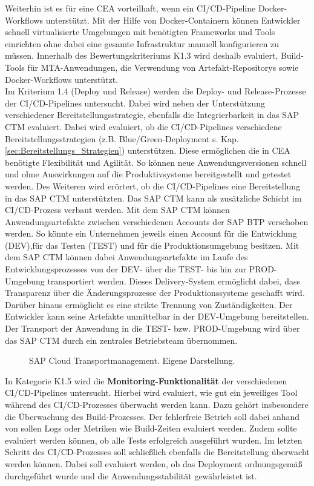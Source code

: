 \vspace*{-10mm}
Weiterhin ist es für eine CEA vorteilhaft, wenn ein CI/CD-Pipeline Docker-Workflows unterstützt. Mit der Hilfe von Docker-Containern können Entwickler schnell virtualisierte Umgebungen mit benötigten Frameworks und Tools einrichten ohne dabei eine gesamte Infrastruktur manuell konfigurieren zu müssen. Innerhalb des Bewertungskriteriums K1.3 wird deshalb evaluiert, Build-Tools für MTA-Anwendungen, die Verwendung von Artefakt-Repositorys sowie Docker-Workflows unterstützt.\\
Im Kriterium 1.4 (Deploy und Release) werden die Deploy- und Release-Prozesse der CI/CD-Pipelines untersucht. Dabei wird neben der Unterstützung verschiedener Bereitstellungsstrategie, ebenfalls die Integrierbarkeit in das \ac{SAP CTM} evaluiert. Dabei wird evaluiert, ob die CI/CD-Pipelines verschiedene Bereitstellungsstrategien (z.B. Blue/Green-Deployment s. Kap. \ref{sec:Bereitstellungs_Strategien}) unterstützen. Diese ermöglichen die in CEA benötigte Flexibilität und Agilität. So können neue Anwendungsversionen schnell und ohne Auswirkungen auf die Produktivsysteme bereitgestellt und getestet werden. Des Weiteren wird erörtert, ob die CI/CD-Pipelines eine Bereitstellung in das \ac{SAP CTM} unterstützten. Das SAP CTM kann als zusätzliche Schicht im CI/CD-Prozess verbaut werden. Mit dem SAP CTM können Anwendungsartefakte zwischen verschiedenen Accounts der SAP BTP verschoben werden. So könnte ein Unternehmen jeweils einen Account für die Entwicklung (DEV),für das Testen (TEST) und für die Produktionsumgebung besitzen. Mit dem SAP CTM können dabei Anwendungsartefakte im Laufe des Entwicklungsprozesses von der DEV- über die TEST- bis hin zur PROD-Umgebung transportiert werden. Dieses Delivery-System ermöglicht dabei, dass Transparenz über die Änderungsprozesse der Produktionssysteme geschafft wird. Darüber hinaus ermöglicht es eine strikte Trennung von Zuständigkeiten. Der Entwickler kann seine Artefakte unmittelbar in der DEV-Umgebung bereitstellen. Der Transport der Anwendung in die TEST- bzw. PROD-Umgebung wird über das SAP CTM durch ein zentrales Betriebsteam übernommen. 
\begin{center}
	\begin{figure}[H]
		\centering
		\caption[SAP Cloud Transportmanagement]{SAP Cloud Transportmanagement. Eigene Darstellung.}
		\label{fig:CTM}
	\end{figure}
\end{center}
\vspace*{-10mm}In Kategorie K1.5 wird die \textbf{Monitoring-Funktionalität} der verschiedenen CI/CD-Pipelines untersucht. Hierbei wird evaluiert, wie gut ein jeweiliges Tool während des CI/CD-Prozesses überwacht werden kann. Dazu gehört insbesondere die Überwachung des Build-Prozesses. Der fehlerfreie Betrieb soll dabei anhand von sollen Logs oder Metriken wie Build-Zeiten evaluiert werden. Zudem sollte evaluiert werden können, ob alle Tests erfolgreich ausgeführt wurden. Im letzten Schritt des CI/CD-Prozesses soll schließlich ebenfalls die Bereitstellung überwacht werden können. Dabei soll evaluiert werden, ob das Deployment ordnungsgemäß durchgeführt wurde und die Anwendungsstabilität gewährleistet ist.\\
